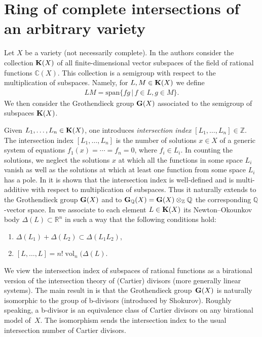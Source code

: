 \documentclass[10pt,a4paper]{amsart}
\def \C{\mathbb{C}}
\def \Z{\mathbb{Z}}
\def \R{\mathbb{R}}
\def \Q{\mathbb{Q}}
\def \K{{\bf K}}
\def \G{{\bf G}}
\def \vol{\operatorname{vol}}
\numberwithin{equation}{section}
\theoremstyle{definition}
\begin{document}
\section{Ring of complete intersections of an arbitrary variety}\label{sec-ring-complete-intersec-general}

Let $X$ be a variety (not necessarily complete). In \cite{KKh-MMJ, KKh-CMB} the authors consider the collection $\K(X)$ of all finite-dimensional vector subspaces of the field of rational functions $\C(X)$. This collection is a semigroup with respect to the multiplication of subspaces. Namely, for $L, M \in \K(X)$ we define
\begin{gather*} LM = \text{span}\{fg \,|\, f \in L, g \in M\}.\end{gather*}
We then consider the Grothendieck group $\G(X)$ associated to the semigroup of subspaces $\K(X)$.

Given $L_1, \ldots, L_n \in \K(X)$, one introduces {\it intersection index} $[L_1, \ldots, L_n] \in \Z$.
The intersection index $[L_1, \ldots , L_n]$ is the number of solutions $x \in X$ of a generic system of equations $f_1(x) = \cdots = f_n = 0$, where $f_i \in L_i$. In counting the solutions, we neglect the solutions $x$ at which all the functions in some space $L_i$ vanish as well as the solutions at which at least one function from some space $L_i$ has a pole. In \cite{KKh-MMJ, KKh-CMB} it is shown that the intersection index is well-defined and is multi-additive with respect to multiplication of subspaces. Thus it naturally extends to the Grothendieck group $\G(X)$ and to $\G_\Q(X) = \G(X) \otimes_\Z \Q$ the corresponding $\Q$-vector space. In \cite[Section~4.3]{KKh-Annals} we associate to each element $L\in \K(X)$ its Newton--Okounkov body $\Delta(L) \subset \R^n$ in such a way that the following conditions hold:
\begin{enumerate}\itemsep=0pt
\item[1)] $\Delta (L_1)+\Delta (L_2) \subset \Delta (L_1 L_2)$,
\item[2)] $[L,\dots,L]=n! \vol_n(\Delta(L)$.
\end{enumerate}

We view the intersection index of subspaces of rational functions as a birational version of the intersection theory of (Cartier) divisors (more generally linear systems).
The main result in \cite{KKh-CMB} is that the Grothendieck group~$\G(X)$ is naturally isomorphic to the group of b-divisors (introduced by Shokurov). Roughly speaking, a b-divisor is an equivalence class of Cartier divisors on any birational model of~$X$. The isomorphism sends the intersection index to the usual intersection number of Cartier divisors.
\end{document}
